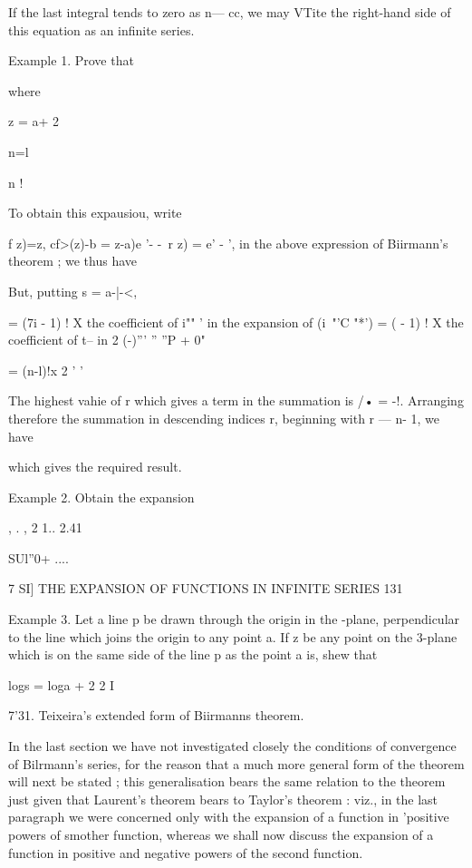 If the last integral tends to zero as n— cc, we may VTite the
right-hand side of this equation as an infinite series.



Example 1. Prove that



where



z = a+ 2

n=l



n !



To obtain this expausiou, write

f z)=z, cf>(z)-b = z-a)e '- -\ r z) = e' - ', in the above expression
of Biirmann's theorem ; we thus have

But, putting s = a-|-<,

= (7i - 1) ! X the coefficient of i"" ' in the expansion of (i~"'C
"*') = ( - 1) ! X the coefficient of t-- in 2 (-)''' '' ''P + 0"

= (n-l)!x 2 ' '



The highest vahie of r which gives a term in the summation is /• = -!.
Arranging therefore the summation in descending indices r, beginning
with r — n- 1, we have

which gives the required result.

Example 2. Obtain the expansion



, . , 2 1.. 2.41



SUl''0+ ....



7 SI] THE EXPANSION OF FUNCTIONS IN INFINITE SERIES 131

Example 3. Let a line p be drawn through the origin in the -plane,
perpendicular to the line which joins the origin to any point a. If z
be any point on the 3-plane which is on the same side of the line p as
the point a is, shew that

logs = loga + 2 2 I

7'31. Teixeira's extended form of Biirmanns theorem.

In the last section we have not investigated closely the conditions of
convergence of Bilrmann's series, for the reason that a much more
general form of the theorem will next be stated ; this generalisation
bears the same relation to the theorem just given that Laurent's
theorem bears to Taylor's theorem : viz., in the last paragraph we
were concerned only with the expansion of a function in 'positive
powers of smother function, whereas we shall now discuss the expansion
of a function in positive and negative powers of the second function.

